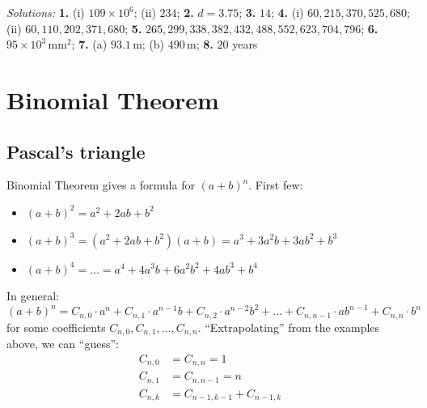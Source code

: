 \documentclass[
  12pt,
  oneside]{book}
\providecommand{\tightlist}{%
  \setlength{\itemsep}{0pt}\setlength{\parskip}{0pt}}
\theoremstyle{definition}
\theoremstyle{definition}
\theoremstyle{definition}
\theoremstyle{definition}
\theoremstyle{remark}
\begin{document}
\emph{Solutions:}
\textbf{1.} (i) \(109\times 10^6\); (ii) \(234\);
\textbf{2.} \(d=3.75\);
\textbf{3.} \(14\);
\textbf{4.} (i) \(60,215,370,525,680\); (ii) \(60,110,202,371,680\);
\textbf{5.} \(265,299,338,382,432,488,552,623,704,796\);
\textbf{6.} \(95\times 10^3\,\mathrm{mm}^2\);
\textbf{7.} (a) \(93.1\,\mathrm{m}\); (b) \(490\,\mathrm{m}\);
\textbf{8.} \(20\) years

\chapter{Binomial Theorem}\label{binomial-theorem}

\section{Pascal's triangle}\label{pascals-triangle}

Binomial Theorem gives a formula for \((a+b)^n\).
First few:

\begin{itemize}
\tightlist
\item
  \((a+b)^2 = a^2+2ab+b^2\)
\item
  \((a+b)^3 = (a^2+2ab+b^2)(a+b) = a^3+3a^2b+3ab^2+b^3\)
\item
  \((a+b)^4 = \dots = a^4+4a^3b+6a^2b^2 + 4ab^3 + b^4\)
\end{itemize}

In general:
\[
(a+b)^n = C_{n,0}\cdot a^n + C_{n,1}\cdot a^{n-1}b + C_{n,2}\cdot a^{n-2}b^2 + \dots + C_{n,n-1}\cdot ab^{n-1} + C_{n,n}\cdot b^n
\]
for some coefficients \(C_{n,0},C_{n,1},\dots,C_{n,n}\). ``Extrapolating'' from the examples above, we can ``guess'':
\begin{align*}
    C_{n,0} &= C_{n,n} = 1\\
    C_{n,1} &= C_{n,n-1} = n\\
    C_{n,k} &= C_{n-1,k-1}+C_{n-1,k}
\end{align*}
\end{document}
